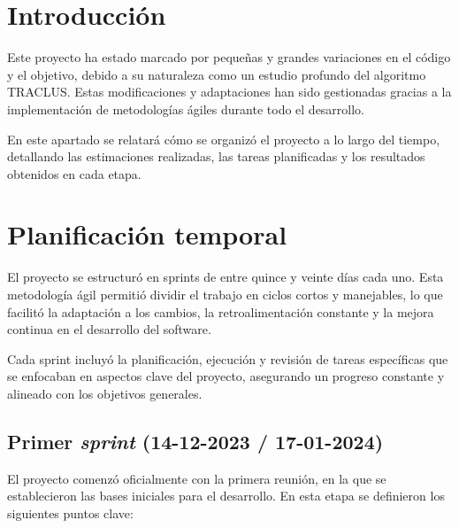 
\section{Introducción}

Este proyecto ha estado marcado por pequeñas y grandes variaciones en el código y el objetivo, debido a su naturaleza como un estudio profundo del algoritmo TRACLUS. Estas modificaciones y adaptaciones han sido gestionadas gracias a la implementación de metodologías ágiles durante todo el desarrollo. 

En este apartado se relatará cómo se organizó el proyecto a lo largo del tiempo, detallando las estimaciones realizadas, las tareas planificadas y los resultados obtenidos en cada etapa.

\section{Planificación temporal}

El proyecto se estructuró en sprints de entre quince y veinte días cada uno. Esta metodología ágil permitió dividir el trabajo en ciclos cortos y manejables, lo que facilitó la adaptación a los cambios, la retroalimentación constante y la mejora continua en el desarrollo del software.

Cada sprint incluyó la planificación, ejecución y revisión de tareas específicas que se enfocaban en aspectos clave del proyecto, asegurando un progreso constante y alineado con los objetivos generales.

\subsection{Primer \textit{sprint} (14-12-2023 / 17-01-2024)}

El proyecto comenzó oficialmente con la primera reunión, en la que se establecieron las bases iniciales para el desarrollo. En esta etapa se definieron los siguientes puntos clave:

